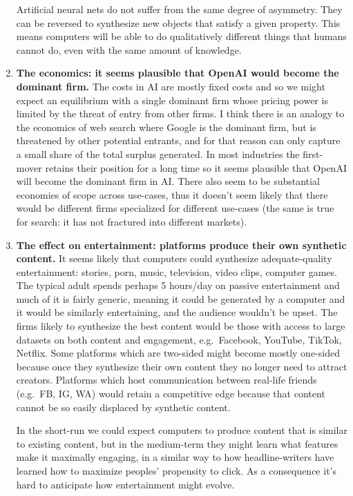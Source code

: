 \documentclass[
  11pt,
  letterpaper,
  DIV=11,
  numbers=noendperiod,
  oneside]{scrartcl}
\begin{document}
\begin{enumerate}
  Artificial neural nets do not suffer from the same degree of
  asymmetry. They can be reversed to synthesize new objects that satisfy
  a given property. This means computers will be able to do
  qualitatively different things that humans cannot do, even with the
  same amount of knowledge.
\item
  \textbf{The economics: it seems plausible that OpenAI would become the
  dominant firm.} The costs in AI are mostly fixed costs and so we might
  expect an equilibrium with a single dominant firm whose pricing power
  is limited by the threat of entry from other firms. I think there is an analogy to the economics of web
  search where Google is the dominant firm, but is threatened by other
  potential entrants, and for that reason can only capture a small share
  of the total surplus generated. In most industries the first-mover
  retains their position for a long time so it seems plausible that
  OpenAI will become the dominant firm in AI. There also seem to be
  substantial economies of scope across use-cases, thus it doesn't seem
  likely that there would be different firms specialized for different
  use-cases (the same is true for search: it has not fractured into
  different markets).
\item
  \textbf{The effect on entertainment: platforms produce their own
  synthetic content.} It seems likely that computers could synthesize
  adequate-quality entertainment: stories, porn, music, television,
  video clips, computer games. The typical adult spends perhaps 5
  hours/day on passive entertainment and much of it is fairly generic,
  meaning it could be generated by a computer and it would be similarly
  entertaining, and the audience wouldn't be upset. The firms likely to
  synthesize the best content would be those with access to large
  datasets on both content and engagement, e.g.~Facebook, YouTube,
  TikTok, Netflix. Some platforms which are two-sided might become
  mostly one-sided because once they synthesize their own content they
  no longer need to attract creators. Platforms which host communication
  between real-life friends (e.g.~FB, IG, WA) would retain a competitive
  edge because that content cannot be so easily displaced by synthetic
  content.

  In the short-run we could expect computers to produce content that is
  similar to existing content, but in the medium-term they might learn
  what features make it maximally engaging, in a similar way to how
  headline-writers have learned how to maximize peoples' propensity to
  click. As a consequence it's hard to anticipate how entertainment
  might evolve.


\end{enumerate}
\end{document}
